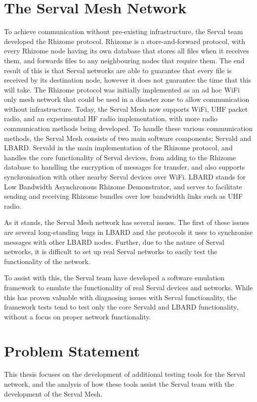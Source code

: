 \section{The Serval Mesh Network}
To achieve communication without pre-existing infrastructure, the Serval team developed the Rhizome protocol.
Rhizome is a store-and-forward protocol, with every Rhizome node having its own database that stores all files when it receives them, and forwards files to any neighbouring nodes that require them.
The end result of this is that Serval networks are able to guarantee that every file is received by its destination node, however it does not guarantee the time that this will take.
The Rhizome protocol was initially implemented as an ad hoc WiFi only mesh network that could be used in a disaster zone to allow communication without infrastructure.
Today, the Serval Mesh now supports WiFi, UHF packet radio, and an experimental HF radio implementation, with more radio communication methods being developed.
To handle these various communication methods, the Serval Mesh consists of two main software components; Servald and LBARD.
Servald in the main implementation of the Rhizome protocol, and handles the core functionality of Serval devices, from adding to the Rhizome database to handling the encryption of messages for transfer, and also supports synchronisation with other nearby Serval devices over WiFi.
LBARD stands for Low Bandwidth Asynchronous Rhizome Demonstrator, and serves to facilitate sending and receiving Rhizome bundles over low bandwidth links such as UHF radio.

As it stands, the Serval Mesh network has several issues.
The first of these issues are several long-standing bugs in LBARD and the protocols it uses to synchronise messages with other LBARD nodes.
Further, due to the nature of Serval networks, it is difficult to set up real Serval networks to easily test the functionality of the network.

To assist with this, the Serval team have developed a software emulation framework to emulate the functionality of real Serval devices and networks.
While this has proven valuable with diagnosing issues with Serval functionality, the framework tests tend to test only the core Servald and LBARD functionality, without a focus on proper network functionality.

\section{Problem Statement}
This thesis focuses on the development of additional testing tools for the Serval network, and the analysis of how these tools assist the Serval team with the development of the Serval Mesh.

